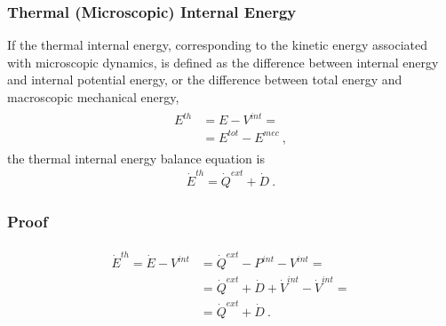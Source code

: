 \documentclass[letterpaper,10pt,english]{jupyterBook}
\begin{document}
\subsubsection{Thermal (Microscopic) Internal Energy}
\label{\detokenize{ch/circuits-electromechanic-old:thermal-microscopic-internal-energy}}
\sphinxAtStartPar
If the thermal internal energy, corresponding to the kinetic energy associated with microscopic dynamics, is defined as the difference between internal energy and internal potential energy, or the difference between total energy and macroscopic mechanical energy,
\begin{equation*}
\begin{split}\begin{aligned}
  E^{th} & = E - V^{int} = \\
         & = E^{tot} - E^{mec} \ ,
\end{aligned}\end{split}
\end{equation*}
\sphinxAtStartPar
the thermal internal energy balance equation is
\begin{equation*}
\begin{split}   \dot{E}^{th} = \dot{Q}^{ext} + \dot{D} \ . \end{split}
\end{equation*}\subsubsection*{Proof}
\begin{equation*}
\begin{split}\begin{aligned}
  \dot{E}^{th} = \dot{E} - V^{int}
    & = \dot{Q}^{ext} - P^{int} - V^{int} = \\
    & = \dot{Q}^{ext} + \dot{D} + \dot{V}^{int} - \dot{V}^{int} = \\
    & = \dot{Q}^{ext} + \dot{D} \ .
\end{aligned}\end{split}
\end{equation*}
\sphinxAtStartPar
{} 
\end{document}
